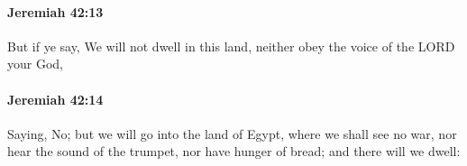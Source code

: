 		\paragraph{Jeremiah 42:13} %
			\label{JEREMIAH-42-13}

			But if ye say, We will not dwell in this land, neither obey the voice of the LORD your God,


		\paragraph{Jeremiah 42:14} %
			\label{JEREMIAH-42-14}

			Saying, No; but we will go into the land of Egypt, where we shall see no war, nor hear the sound of the trumpet, nor have hunger of bread; and there will we dwell:


